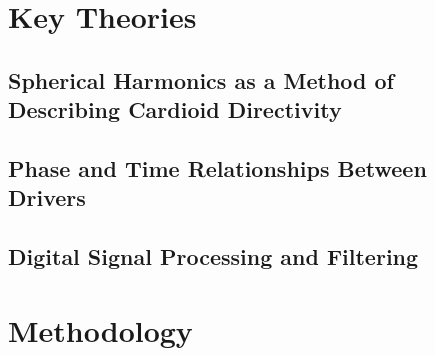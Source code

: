 \documentclass{report}
\begin{document}
    







\chapter{Key Theories}
    \section{Spherical Harmonics as a Method of Describing Cardioid Directivity}
    \section{Phase and Time Relationships Between Drivers}
    \section{Digital Signal Processing and Filtering}


\chapter{Methodology}
\end{document}
